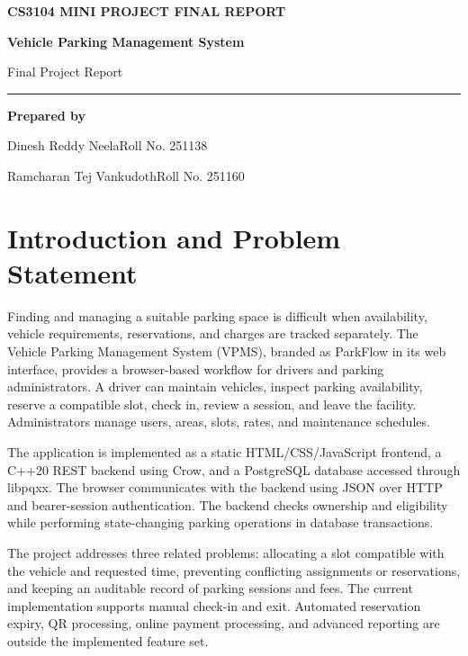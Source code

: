 \documentclass[12pt,a4paper]{article}
\begin{document}
\thispagestyle{empty}
\setlength{\parindent}{0pt}
\vspace*{1.8cm}
{\large\bfseries\color{green!35!black} CS3104 MINI PROJECT FINAL REPORT\par}
\vspace{1.1cm}
{\Huge\bfseries Vehicle Parking Management System\par}
\vspace{0.55cm}
{\large\color{black!65} Final Project Report\par}
\vspace{0.7cm}
{\color{green!35!black}\rule{0.9\textwidth}{1.2pt}\par}
\vspace{1.4cm}
{\Large\bfseries Prepared by\par}
\vspace{0.45cm}
{\large Dinesh Reddy Neela\hfill Roll No. 251138\par}
\vspace{0.3cm}
{\large Ramcharan Tej Vankudoth\hfill Roll No. 251160\par}
\vfill
\newpage
\renewcommand{\contentsname}{Contents}
\begingroup\small\tableofcontents\endgroup
\clearpage

\section{Introduction and Problem Statement}
Finding and managing a suitable parking space is difficult when availability,
vehicle requirements, reservations, and charges are tracked separately. The
Vehicle Parking Management System (VPMS), branded as ParkFlow in its web
interface, provides a browser-based workflow for drivers and parking
administrators. A driver can maintain vehicles, inspect parking availability,
reserve a compatible slot, check in, review a session, and leave the facility.
Administrators manage users, areas, slots, rates, and maintenance schedules.

The application is implemented as a static HTML/CSS/JavaScript frontend, a
C++20 REST backend using Crow, and a PostgreSQL
database accessed through libpqxx. The browser communicates with the backend using JSON over HTTP and
bearer-session authentication. The backend checks ownership and eligibility
while performing state-changing parking operations in database transactions.

The project addresses three related problems: allocating a slot compatible
with the vehicle and requested time, preventing conflicting assignments or
reservations, and keeping an auditable record of parking sessions and fees.
The current implementation supports manual check-in and exit. Automated
reservation expiry, QR processing, online payment processing, and advanced
reporting are outside the implemented feature set.
\end{document}
